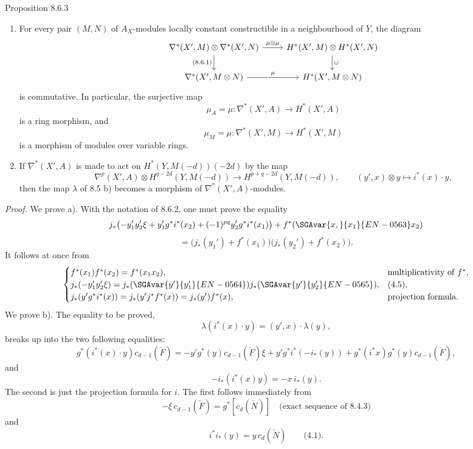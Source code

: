 \begin{statement}{Proposition 8.6.3}
\begin{enumerate}[label=\alph*)]
\item For every pair $(M,N)$ of $A_X$-modules locally constant constructible in a neighbourhood of $Y$, the diagram
\[
\begin{tikzcd}
\nabla^*(X',M)\otimes\nabla^*(X',N)\arrow[r,"\mu\otimes\mu"]\arrow[d,"{(8.6.1)}"']&
H^*(X',M)\otimes H^*(X',N)\arrow[d,"\cup"]\\
\nabla^*(X',M\otimes N)\arrow[r,"\mu"]&
H^*(X',M\otimes N)
\end{tikzcd}
\]
is commutative. In particular, the surjective map
\[
\mu_A=\mu:\nabla^*(X',A)\to H^*(X',A)
\]
is a ring morphism, and
\[
\mu_M=\mu:\nabla^*(X',M)\to H^*(X',M)
\]
is a morphism of modules over variable rings.
\item If $\nabla^*(X',A)$ is made to act on $H^*(Y,M(-d))(-2d)$ by the map
\[
\nabla^p(X',A)\otimes H^{q-2d}(Y,M(-d))
\to H^{p+q-2d}(Y,M(-d)),
\qquad
(y',x)\otimes y\mapsto i^*(x)\cdot y,
\]
then the map $\lambda$ of 8.5 b) becomes a morphism of $\nabla^*(X',A)$-modules.
\end{enumerate}
\end{statement}

\emph{Proof.} We prove a). With the notation of 8.6.2, one must prove the equality
\[
j_*\bigl(-y_1'y_2'\xi+y_1'g^*i^*(x_2)+(-1)^{pq}y_2'g^*i^*(x_1)\bigr)+f^*(\SGAvar{x,}{x_1}{EN-0563}x_2)
\]
\[
=\bigl(j_*(y_1')+f^*(x_1)\bigr)\bigl(j_*(y_2')+f^*(x_2)\bigr).
\]
It follows at once from
\[
\begin{cases}
f^*(x_1)f^*(x_2)=f^*(x_1x_2),&\text{multiplicativity of }f^*,\\
j_*(-y_1'y_2'\xi)=j_*(\SGAvar{y'}{y_1'}{EN-0564})j_*(\SGAvar{y'}{y_2'}{EN-0565}),&\text{(4.5)},\\
j_*(y'g^*i^*(x))=j_*(y'j^*f^*(x))=j_*(y')f^*(x),&\text{projection formula}.
\end{cases}
\]
We prove b). The equality to be proved,
\[
\lambda(i^*(x)\cdot y)=(y',x)\cdot\lambda(y),
\]
breaks up into the two following equalities:
\[
g^*(i^*(x)\cdot y)c_{d-1}(\check F)
=
-y'g^*(y)c_{d-1}(\check F)\xi
+y'g^*i^*(-i_*(y))
+g^*(i^*x)g^*(y)c_{d-1}(\check F),
\]
and
\[
-i_*(i^*(x)y)=-x\,i_*(y).
\]
The second is just the projection formula for $i$. The first follows immediately from
\[
-\xi\,c_{d-1}(\check F)=g^*[c_d(\check N)]
\quad\text{(exact sequence of 8.4.3)}
\]
and
\[
i^*i_*(y)=y\,c_d(\check N)\qquad\text{(4.1)}.
\]

